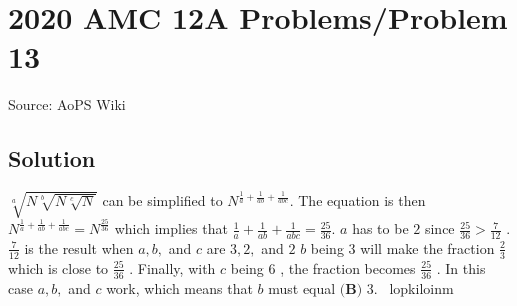 \documentclass[12pt]{article}
\begin{document}
\section*{{2020 AMC 12A Problems/Problem 13}}
Source: AoPS Wiki

\subsection*{Solution}
$\sqrt[a]{N\sqrt[b]{N\sqrt[c]{N}}}$ can be simplified to $N^{\frac{1}{a}+\frac{1}{ab}+\frac{1}{abc}}.$ The equation is then $N^{\frac{1}{a}+\frac{1}{ab}+\frac{1}{abc}}=N^{\frac{25}{36}}$ which implies that $\frac{1}{a}+\frac{1}{ab}+\frac{1}{abc}=\frac{25}{36}.$ $a$ has to be $2$ since $\frac{25}{36}>\frac{7}{12}$ . $\frac{7}{12}$ is the result when $a, b,$ and $c$ are $3, 2,$ and $2$ $b$ being $3$ will make the fraction $\frac{2}{3}$ which is close to $\frac{25}{36}$ . Finally, with $c$ being $6$ , the fraction becomes $\frac{25}{36}$ . In this case $a, b,$ and $c$ work, which means that $b$ must equal $\boxed{\textbf{(B) } 3.}$ ~lopkiloinm
\end{document}
